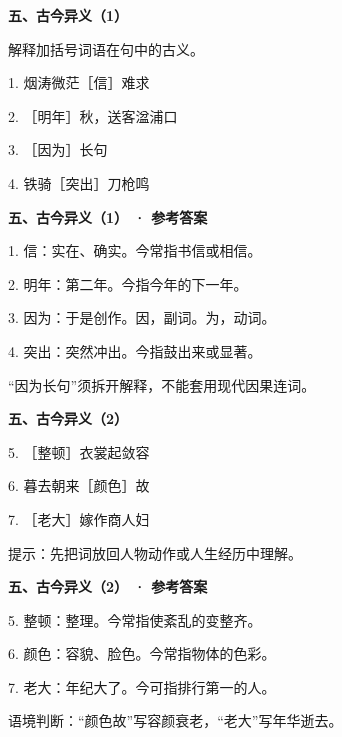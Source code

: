 \documentclass[UTF8,10pt,aspectratio=169]{ctexbeamer}
\newcommand{\PageHeading}[1]{\begin{center}{\Large\bfseries #1}\end{center}\vspace{0.2cm}}
\begin{document}
\begin{frame}
\PageHeading{五、古今异义（1）}
解释加括号词语在句中的古义。\par\vspace{0.23cm}
1. 烟涛微茫［信］难求\par\vspace{0.23cm}
2. ［明年］秋，送客湓浦口\par\vspace{0.23cm}
3. ［因为］长句\par\vspace{0.23cm}
4. 铁骑［突出］刀枪鸣\par\vspace{0.23cm}
\end{frame}
\begin{frame}
\PageHeading{五、古今异义（1） · 参考答案}
1. 信：实在、确实。今常指书信或相信。\par\vspace{0.23cm}
2. 明年：第二年。今指今年的下一年。\par\vspace{0.23cm}
3. 因为：于是创作。因，副词。为，动词。\par\vspace{0.23cm}
4. 突出：突然冲出。今指鼓出来或显著。\par\vspace{0.23cm}
“因为长句”须拆开解释，不能套用现代因果连词。\par\vspace{0.23cm}
\end{frame}
\begin{frame}
\PageHeading{五、古今异义（2）}
5. ［整顿］衣裳起敛容\par\vspace{0.23cm}
6. 暮去朝来［颜色］故\par\vspace{0.23cm}
7. ［老大］嫁作商人妇\par\vspace{0.23cm}
提示：先把词放回人物动作或人生经历中理解。\par\vspace{0.23cm}
\end{frame}
\begin{frame}
\PageHeading{五、古今异义（2） · 参考答案}
5. 整顿：整理。今常指使紊乱的变整齐。\par\vspace{0.23cm}
6. 颜色：容貌、脸色。今常指物体的色彩。\par\vspace{0.23cm}
7. 老大：年纪大了。今可指排行第一的人。\par\vspace{0.23cm}
语境判断：“颜色故”写容颜衰老，“老大”写年华逝去。\par\vspace{0.23cm}
\end{frame}
\end{document}
